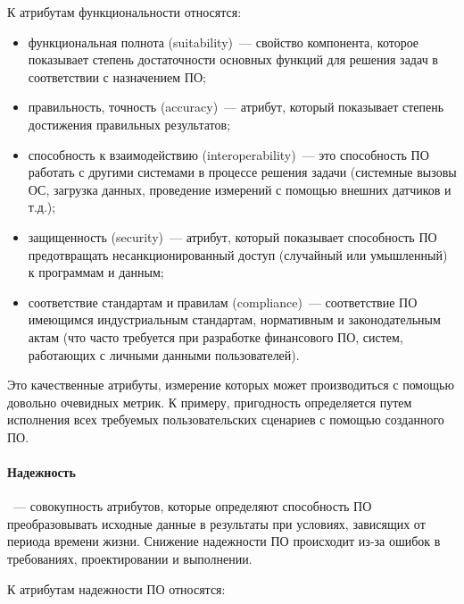 \documentclass{../../text-style}
\begin{document}
К атрибутам функциональности относятся:

\begin{itemize}
    \item функциональная полнота (suitability)~--- свойство компонента, которое показывает степень достаточности основных функций для решения задач в соответствии с назначением ПО;
    \item правильность, точность (accuracy)~--- атрибут, который показывает степень достижения правильных результатов;
    \item способность к взаимодействию (interoperability)~--- это способность ПО работать с другими системами в процессе решения задачи (системные вызовы ОС, загрузка данных, проведение измерений с помощью внешних датчиков и т.д.);
    \item защищенность (security)~--- атрибут, который показывает способность ПО предотвращать несанкционированный доступ (случайный или умышленный) к программам и данным;
    \item соответствие стандартам и правилам (compliance)~--- соответствие ПО имеющимся индустриальным стандартам, нормативным и законодательным актам (что часто требуется при разработке финансового ПО, систем, работающих с личными данными пользователей).
\end{itemize}

Это качественные атрибуты, измерение которых может производиться с помощью довольно очевидных метрик. К примеру, пригодность определяется путем исполнения всех требуемых пользовательских сценариев с помощью созданного ПО.

\paragraph{Надежность}~--- совокупность атрибутов, которые определяют способность ПО преобразовывать исходные данные в результаты при условиях, зависящих от периода времени жизни. Снижение надежности ПО происходит из-за ошибок в требованиях, проектировании и выполнении.

К атрибутам надежности ПО относятся:
\end{document}
